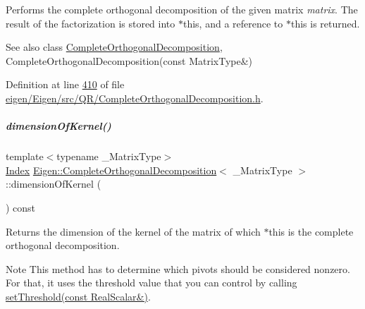 Performs the complete orthogonal decomposition of the given matrix {\itshape matrix}. The result of the factorization is stored into {\ttfamily $\ast$this}, and a reference to {\ttfamily $\ast$this} is returned.

\begin{DoxySeeAlso}{See also}
class \hyperlink{group___q_r___module_class_eigen_1_1_complete_orthogonal_decomposition}{Complete\+Orthogonal\+Decomposition}, Complete\+Orthogonal\+Decomposition(const Matrix\+Type\&) 
\end{DoxySeeAlso}


Definition at line \hyperlink{eigen_2_eigen_2src_2_q_r_2_complete_orthogonal_decomposition_8h_source_l00410}{410} of file \hyperlink{eigen_2_eigen_2src_2_q_r_2_complete_orthogonal_decomposition_8h_source}{eigen/\+Eigen/src/\+Q\+R/\+Complete\+Orthogonal\+Decomposition.\+h}.

\mbox{\label{group___q_r___module_aca2b59560c4851b7d7701872990a3426}} 
\subparagraph{\texorpdfstring{dimension\+Of\+Kernel()}{dimensionOfKernel()}\hspace{0.1cm}{\footnotesize\ttfamily [1/2]}}
{\footnotesize\ttfamily template$<$typename \+\_\+\+Matrix\+Type$>$ \\
\hyperlink{namespace_eigen_a62e77e0933482dafde8fe197d9a2cfde}{Index} \hyperlink{group___q_r___module_class_eigen_1_1_complete_orthogonal_decomposition}{Eigen\+::\+Complete\+Orthogonal\+Decomposition}$<$ \+\_\+\+Matrix\+Type $>$\+::dimension\+Of\+Kernel (\begin{DoxyParamCaption}{ }\end{DoxyParamCaption}) const\hspace{0.3cm}{\ttfamily [inline]}}

\begin{DoxyReturn}{Returns}
the dimension of the kernel of the matrix of which $\ast$this is the complete orthogonal decomposition.
\end{DoxyReturn}
\begin{DoxyNote}{Note}
This method has to determine which pivots should be considered nonzero. For that, it uses the threshold value that you can control by calling \hyperlink{group___q_r___module_aa9c9f7cbde9d58ca5552381b70ad8d82}{set\+Threshold(const Real\+Scalar\&)}. 
\end{DoxyNote}


